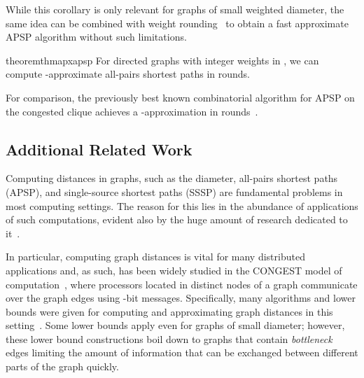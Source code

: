 While this corollary is only relevant for graphs of small weighted diameter, the same idea can be combined with weight rounding~\cite{raghavan85,zwick2002all,nanongkai14} to obtain a fast approximate APSP algorithm without such limitations.

\begin{restatable}{theorem}{thmapxapsp}
For directed graphs with integer weights in , we can compute -approximate all-pairs shortest paths in  rounds.
\end{restatable}

For comparison, the previously best known combinatorial algorithm for APSP on the congested clique achieves a -approximation in  rounds~\cite{nanongkai14}.

\subsection{Additional Related Work}\label{sec:related-work}
Computing distances in graphs,
such as the diameter, all-pairs shortest paths (APSP), and single-source shortest paths (SSSP)
are fundamental problems in most computing settings.
The reason for this lies in the abundance of applications of such computations, evident also by the huge amount of research dedicated to it~\cite{Chan10_apsp,HanT12_apsp,
Han08_apsp,Takaoka04_apsp,Zwick06_APSP,Takaoka05_apsp,Chan08_apsp,Fredman76_apsp,
williams2014apsp,
Zwick01_graph_distances_survey,zwick2002all}.

In particular, computing graph distances is vital for many distributed applications and, as such, has been widely studied in the CONGEST model of computation~\cite{peleg00}, where  processors located in  distinct nodes of a graph  communicate over the graph edges using -bit messages. Specifically, many algorithms and lower bounds were given for computing and approximating graph distances
in this setting~\cite{DHKNPPW-11, nanongkai14, LP13:podc,HolzerW12, PelegRT12,FHW-12,LenzenP13_routing_tables,holzer14,KP98,PelegR-00}. Some lower bounds apply even for graphs of small diameter; however, these lower bound constructions boil down to graphs that contain \emph{bottleneck} edges limiting the amount of information that can be exchanged between different parts of the graph quickly.

